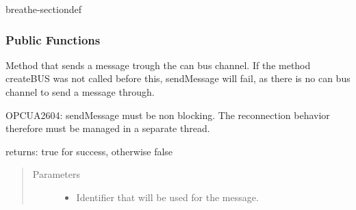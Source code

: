 \documentclass[a4paper,10pt,english]{sphinxmanual}
\begin{document}
\begin{fulllineitems}
\label{\detokenize{classesdetails:_CPPv412CSockCanScan}}%
\pysigstartmultiline
{}%
\pysigstopmultiline
\begin{sphinxuseclass}{breathe-sectiondef}\subsubsection*{Public Functions}

\begin{fulllineitems}
\label{\detokenize{classesdetails:_CPPv4N12CSockCanScan11sendMessageEshPhb}}%
\pysigstartmultiline
{}%
\pysigstopmultiline
\sphinxAtStartPar
Method that sends a message trough the can bus channel. If the method createBUS was not called before this, sendMessage will fail, as there is no can bus channel to send a message through.

\sphinxAtStartPar

OPCUA\sphinxhyphen{}2604: sendMessage must be non blocking. The reconnection behavior therefore must be managed in a separate thread.

\sphinxAtStartPar
returns: true for success, otherwise false 
\begin{quote}\begin{description}
\item[{Parameters}] \leavevmode\begin{itemize}
\item {} 
\sphinxAtStartPar
{} \textendash{} Identifier that will be used for the message. 


\end{itemize}
\end{description}
\end{quote}
\end{fulllineitems}
\end{sphinxuseclass}
\end{fulllineitems}
\end{document}
